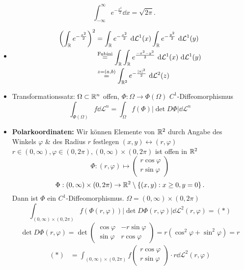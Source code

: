 \begin{example*}
	\[
		\int_{-\infty}^{\infty} e^{- \frac{ x^2 }{ 2 } } \dd x = \sqrt{2 \pi } .
	\]
	\begin{itemize}
		\item 
			\begin{align*}
				\left( \int _{\mathbb{R}} e^{- \frac{ x^2 }{ 2 } }  \right) ^2 &= \int_{\mathbb{R} }^{} e^{- \frac{ x^2 }{ 2 } } ~\text{d} \mathcal{L} ^1(x) \int_{\mathbb{R} }^{} e^{- \frac{ y^2 }{ 2 } } ~\text{d} \mathcal{L} ^1 (y) \\
				~&\overset{\text{Fubini} }{=} \int_{\mathbb{R} } \int _{\mathbb{R} } e^{\frac{ - x^2 - y^2 }{ 2 } } ~\text{d} \mathcal{L} ^1(x) ~\text{d} \mathcal{L} ^1(y) \\
				~&\overset{z = (a, b)}{=} \int _{\mathbb{R} ^2} e^{- \frac{\left| z \right| ^2}{ 2 } } ~\text{d} \mathcal{L} ^2(z)
			\end{align*}
		\item Transformationssatz: $ \Omega \subset \mathbb{R} ^n $ offen, $ \Phi: \Omega \to \Phi(\Omega) $ $ C^1 $-Diffeomorphismus
			\[
				\int _{\Phi(\Omega)}  f \dd \mathcal{L} ^n = \int _{\Omega} f (\Phi) \left| \det D \Phi \right| \dd \mathcal{L} ^n
			\]
		\item \textbf{Polarkoordinaten:}
			Wir können Elemente von $ \mathbb{R} ^2 $ durch Angabe des Winkels $ \varphi $ \& des Radius $ r $ festlegen
			$ (x, y) \leftrightarrow (r, \varphi) $\\
			$ r \in (0, \infty), \varphi \in (0, 2 \pi ), (0, \infty) \times (0, 2 \pi ) $ ist offen in $ \mathbb{R} ^2 $
			\[
				\Phi : (r, \varphi) \mapsto \begin{pmatrix} r \cos \varphi \\ r \sin \varphi \end{pmatrix}
			\]
			\[
				\Phi : (0, \infty) \times (0, 2 \pi ) \to \mathbb{R} ^2 \setminus \left\{ (x, y) : x \geq 0, y = 0 \right\} .
			\]
			Dann ist $ \Phi $ ein $ C^1 $-Diffeomorphismus.
			$ \Omega = \left( 0, \infty \right) \times \left( 0, 2 \pi  \right)  $ 
			\[
				\int _{(0, \infty) \times (0, 2 \pi )} f\left( \Phi(r, \varphi) \right) \left| \det D \Phi (r, \varphi) \right| \dd \mathcal{L} ^2 (r, \varphi) = (*)
			\]
			\[
				\det D \Phi (r, \varphi) = \det \begin{pmatrix} \cos \varphi & - r \sin \varphi \\ \sin \varphi & r \cos \varphi \end{pmatrix} = r \left( \cos ^2 \varphi + \sin ^2 \varphi \right) = r
			\]
			\begin{align*}
				(*) &= \int _{(0, \infty) \times (0, 2 \pi )} f \begin{pmatrix} r \cos \varphi \\ r \sin \varphi \end{pmatrix} \cdot r \dd \mathcal{L} ^2 (r, \varphi)\\

\end{align*}
\end{itemize}
\end{example*}
